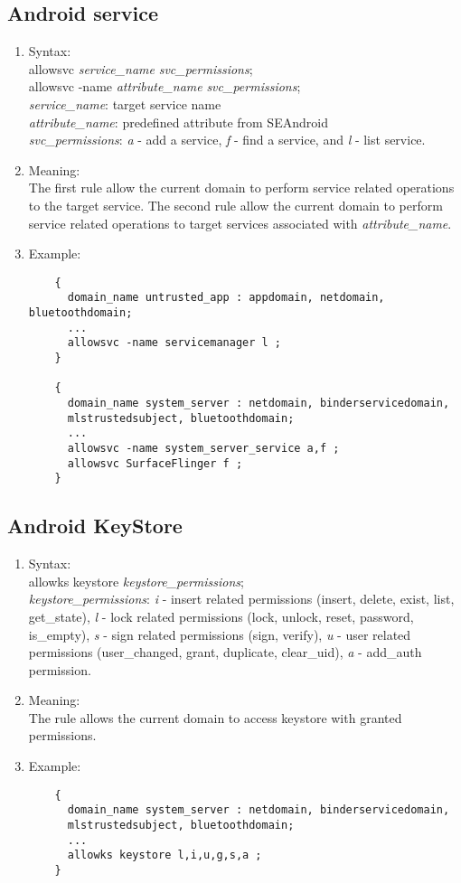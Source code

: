 \documentclass{article}
\begin{document}
\subsection{Android service}
\begin{enumerate}
	\item Syntax:\\
	allowsvc {\em service\_name} {\em svc\_permissions};\\
	allowsvc -name {\em attribute\_name} {\em svc\_permissions};\\
	{\em service\_name}: target service name\\
	{\em attribute\_name}: predefined attribute from SEAndroid\\
	{\em svc\_permissions}: {\em a} - add a service, {\em f} - find a service, 
	and {\em l} - list service.
	\item Meaning:\\
	The first rule allow the current domain to perform service related 
	operations to the target service. The second rule allow the current domain 
	to perform service related operations to target services associated with 
	{\em attribute\_name}.
	\item Example:\\
	\begin{verbatim}
	{
	  domain_name untrusted_app : appdomain, netdomain, bluetoothdomain;
	  ...
	  allowsvc -name servicemanager l ;
	}
	
	{
	  domain_name system_server : netdomain, binderservicedomain, 
	  mlstrustedsubject, bluetoothdomain;
	  ...
	  allowsvc -name system_server_service a,f ;
	  allowsvc SurfaceFlinger f ;
	}
	\end{verbatim}
\end{enumerate}

\subsection{Android KeyStore}
\begin{enumerate}
	\item Syntax:\\
	allowks keystore {\em keystore\_permissions};\\
	{\em keystore\_permissions}: {\em i} - insert related permissions (insert, 
	delete, exist, list, get\_state), {\em l} - lock related permissions (lock, 
	unlock, reset, password, is\_empty), {\em s} - sign related permissions 
	(sign, verify), {\em u} - user related permissions (user\_changed, grant, 
	duplicate, clear\_uid), {\em a} - add\_auth permission.
	\item Meaning:\\
	The rule allows the current domain to access keystore with granted 
	permissions.
	\item Example:\\
	\begin{verbatim}
	{
	  domain_name system_server : netdomain, binderservicedomain, 
	  mlstrustedsubject, bluetoothdomain;
	  ...
	  allowks keystore l,i,u,g,s,a ;
	}
	\end{verbatim}
\end{enumerate}
\end{document}
